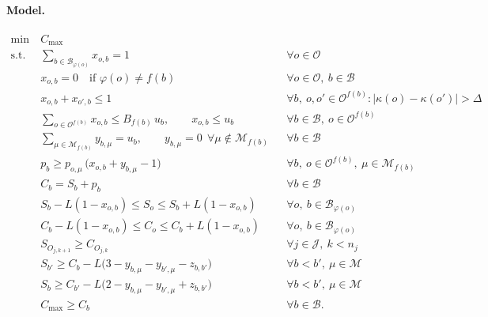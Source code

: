 \documentclass[11pt,a4paper]{article}
\newcommand{\Jset}{\mathcal{J}}
\newcommand{\Oset}{\mathcal{O}}
\newcommand{\Mset}{\mathcal{M}}
\newcommand{\Bset}{\mathcal{B}}
\begin{document}
\paragraph{Model.}
\begin{align}
  \min\ & C_{\max} \label{eq:obj}\\[2pt]
  \text{s.t.}\
  & \sum_{b\in\Bset_{\varphi(o)}} x_{o,b} = 1
    && \forall o\in\Oset \tag{B1}\label{eq:B1}\\
  & x_{o,b}=0 \quad \text{if } \varphi(o)\neq f(b)
    && \forall o\in\Oset,\ b\in\Bset \tag{B2}\label{eq:B2}\\
  & x_{o,b}+x_{o',b} \le 1
    && \forall b,\ o,o'\in\Oset^{f(b)}:|\kappa(o)-\kappa(o')|>\Delta \tag{B2a}\label{eq:B2a}\\
  & \sum_{o\in\Oset^{f(b)}} x_{o,b} \le B_{f(b)}\,u_b,\qquad x_{o,b}\le u_b
    && \forall b\in\Bset,\ o\in\Oset^{f(b)} \tag{B3}\label{eq:B3}\\
  & \sum_{\mu\in\Mset_{f(b)}} y_{b,\mu} = u_b,\qquad y_{b,\mu}=0\ \ \forall\mu\notin\Mset_{f(b)}
    && \forall b\in\Bset \tag{B4}\label{eq:B4}\\
  & p_b \ge p_{o,\mu}\,\bigl(x_{o,b}+y_{b,\mu}-1\bigr)
    && \forall b,\ o\in\Oset^{f(b)},\ \mu\in\Mset_{f(b)} \tag{B4a}\label{eq:B4a}\\
  & C_b = S_b + p_b
    && \forall b\in\Bset \tag{B5}\label{eq:B5}\\
  & S_b - L(1-x_{o,b}) \le S_o \le S_b + L(1-x_{o,b})
    && \forall o,\ b\in\Bset_{\varphi(o)} \tag{B5a}\label{eq:B5a}\\
  & C_b - L(1-x_{o,b}) \le C_o \le C_b + L(1-x_{o,b})
    && \forall o,\ b\in\Bset_{\varphi(o)} \tag{B5b}\label{eq:B5b}\\
  & S_{O_{j,k+1}} \ge C_{O_{j,k}}
    && \forall j\in\Jset,\ k<n_j \tag{B6}\label{eq:B6}\\
  & S_{b'} \ge C_b - L\bigl(3-y_{b,\mu}-y_{b',\mu}-z_{b,b'}\bigr)
    && \forall b<b',\ \mu\in\Mset \tag{B7}\label{eq:B7}\\
  & S_{b} \ge C_{b'} - L\bigl(2-y_{b,\mu}-y_{b',\mu}+z_{b,b'}\bigr)
    && \forall b<b',\ \mu\in\Mset \tag{B7'}\label{eq:B7b}\\
  & C_{\max}\ge C_b
    && \forall b\in\Bset. \label{eq:cmax}
\end{align}
\end{document}
